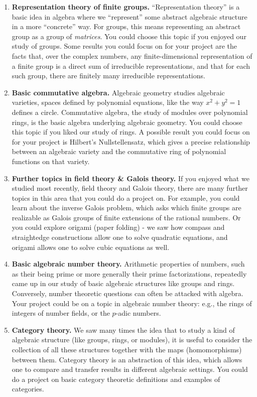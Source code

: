 \documentclass[11pt]{article}
\begin{document}
\begin{enumerate}

\item {\bf Representation theory of finite groups.} ``Representation theory'' is a basic idea in algebra where we ``represent'' some abstract algebraic structure in a more ``concrete'' way. For groups, this means representing an abstract group as a group of \emph{matrices}. You could choose this topic if you enjoyed our study of groups. Some results you could focus on for your project are the facts that, over the complex numbers, any finite-dimensional representation of a finite group is a direct sum of irreducible representations, and that for each such group, there are finitely many irreducible representations.

\item {\bf Basic commutative algebra.} Algebraic geometry studies algebraic varieties, spaces defined by polynomial equations, like the way $x^2+y^2=1$ defines a circle. Commutative algebra, the study of modules over polynomial rings, is the basic algebra underlying algebraic geometry. You could choose this topic if you liked our study of rings. A possible result you could focus on for your project is Hilbert's Nullstellensatz, which gives a precise relationship between an algebraic variety and the commutative ring of polynomial functions on that variety.

\item {\bf Further topics in field theory \& Galois theory.} If you enjoyed what we studied most recently, field theory and Galois theory, there are many further topics in this area that you could do a project on. For example, you could learn about the inverse Galois problem, which asks which finite groups are realizable as Galois groups of finite extensions of the rational numbers. Or you could explore origami (paper folding) - we saw how compass and straightedge constructions allow one to solve quadratic equations, and origami allows one to solve cubic equations as well.

\item {\bf Basic algebraic number theory.} Arithmetic properties of numbers, such as their being prime or more generally their prime factorizations, repeatedly came up in our study of basic algebraic structures like groups and rings. Conversely, number theoretic questions can often be attacked with algebra. Your project could be on a topic in algebraic number theory: e.g., the rings of integers of number fields, or the $p$-adic numbers.

\item {\bf Category theory.} We saw many times the idea that to study a kind of algebraic structure (like groups, rings, or modules), it is useful to consider the collection of all these structures together with the maps (homomorphisms) between them. Category theory is an abstraction of this idea, which allows one to compare and transfer results in different algebraic settings. You could do a project on basic category theoretic definitions and examples of categories.

\end{enumerate}
\end{document}

